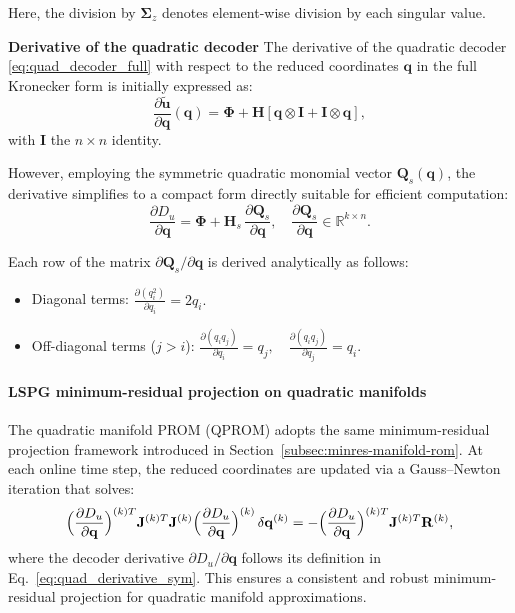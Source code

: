 Here, the division by \(\boldsymbol{\Sigma}_z\) denotes element-wise division by each singular value.

\textbf{Derivative of the quadratic decoder} The derivative of the quadratic decoder \eqref{eq:quad_decoder_full} with respect to the reduced coordinates \(\mathbf{q}\) in the full Kronecker form is initially expressed as:
%
\begin{equation}
\frac{\partial\tilde{\mathbf{u}}}{\partial\mathbf{q}}(\mathbf{q}) =
\boldsymbol{\Phi} +
\mathbf{H}\left[\mathbf{q}\otimes\mathbf{I}+\mathbf{I}\otimes\mathbf{q}\right],
\label{eq:quad_derivative_full}
\end{equation}
%
with \(\mathbf{I}\) the \(n\times n\) identity.

However, employing the symmetric quadratic monomial vector \(\mathbf{Q}_s(\mathbf{q})\), the derivative simplifies to a compact form directly suitable for efficient computation:
%
\begin{equation}
\frac{\partial D_u}{\partial\mathbf{q}} =
\boldsymbol{\Phi} +
\mathbf{H}_s\,\frac{\partial\mathbf{Q}_s}{\partial\mathbf{q}},
\quad
\frac{\partial\mathbf{Q}_s}{\partial\mathbf{q}}\in\mathbb{R}^{k\times n}.
\label{eq:quad_derivative_sym}
\end{equation}

Each row of the matrix \(\partial\mathbf{Q}_s/\partial\mathbf{q}\) is derived analytically as follows:

\begin{itemize}
    \item Diagonal terms: \(\displaystyle\frac{\partial(q_i^2)}{\partial q_i}=2q_i.\)
    \item Off-diagonal terms (\(j>i\)): 
    \(\displaystyle\frac{\partial(q_i q_j)}{\partial q_i}=q_j,\quad \frac{\partial(q_i q_j)}{\partial q_j}=q_i.\)
\end{itemize}

\paragraph{LSPG minimum-residual projection on quadratic manifolds}

The quadratic manifold PROM (QPROM) adopts the same minimum-residual projection framework introduced in Section~\ref{subsec:minres-manifold-rom}. At each online time step, the reduced coordinates are updated via a Gauss--Newton iteration that solves:
\begin{equation}
\Bigl(\frac{\partial D_u}{\partial\mathbf{q}}\Bigr)^{(k)T} 
\mathbf{J}^{(k)T} \mathbf{J}^{(k)}
\Bigl(\frac{\partial D_u}{\partial\mathbf{q}}\Bigr)^{(k)}
\,\delta\mathbf{q}^{(k)}
= 
-\Bigl(\frac{\partial D_u}{\partial\mathbf{q}}\Bigr)^{(k)T}
\mathbf{J}^{(k)T}\mathbf{R}^{(k)},
\label{eq:lspg_quad_proj}
\end{equation}
where the decoder derivative $\partial D_u/\partial \mathbf{q}$ follows its definition in Eq.~\eqref{eq:quad_derivative_sym}. This ensures a consistent and robust minimum-residual projection for quadratic manifold approximations.


